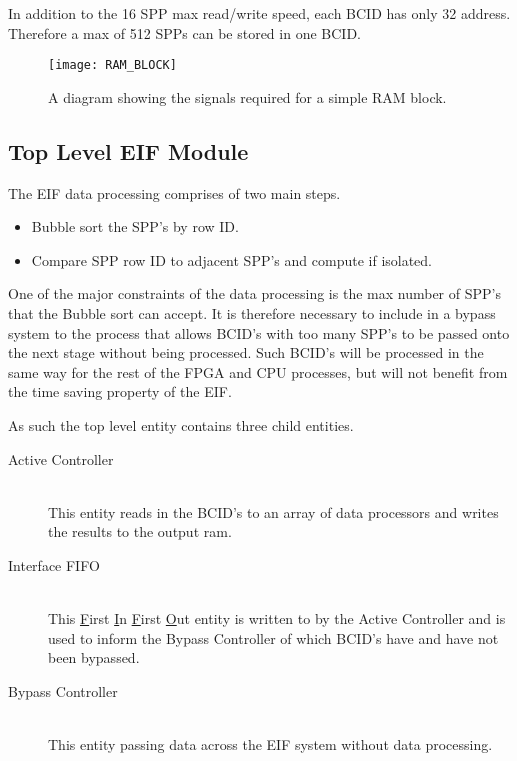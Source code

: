			In addition to the 16 SPP max read/write speed, each BCID has only 32 address.
			Therefore a max of 512 SPPs can be stored in one BCID.

			\begin{figure}[ht]
				\centering
				\texttt{[image: RAM\_BLOCK]}
				\caption{A diagram showing the signals required for a simple RAM block.}
				\label{fig:ram_diagram}
			\end{figure}
	

	\subsection{Top Level EIF Module} %
	\label{sub:top_level_processing}
	
		The EIF data processing comprises of two main steps.

		\begin{itemize}
			\item Bubble sort the SPP's by row ID.
			\item Compare SPP row ID to adjacent SPP's and compute if isolated. 
		\end{itemize}

		One of the major constraints of the data processing is the max number of SPP's that the Bubble sort can accept.
		It is therefore necessary to include in a bypass system to the process that allows BCID's with too many SPP's to be passed onto the next stage without being processed.
		Such BCID's will be processed in the same way for the rest of the FPGA and CPU processes, but will not benefit from the time saving property of the EIF.

		As such the top level entity contains three child entities.

		\begin{description}
			\item[Active Controller] \hfill \\
				This entity reads in the BCID's to an array of data processors and writes the results to the output ram.
			\item[Interface FIFO] \hfill \\
				This \underline{F}irst \underline{I}n \underline{F}irst \underline{O}ut entity is written to by the Active Controller and is used to inform the Bypass Controller of which BCID's have and have not been bypassed.
			\item[Bypass Controller] \hfill \\
				This entity passing data across the EIF system without data processing.
		\end{description}

